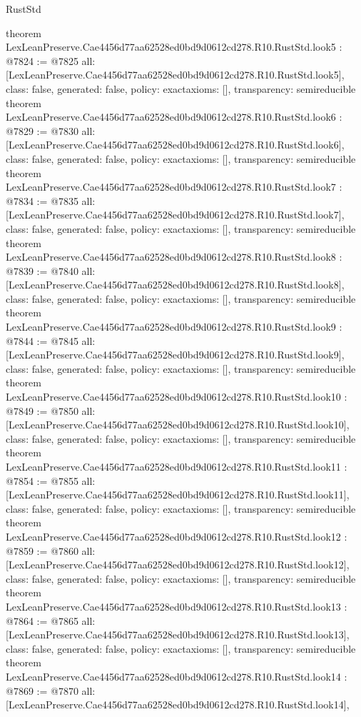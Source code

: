 \begin{lexlean}{RustStd}
\begin{coremodule}
{}
theorem LexLeanPreserve.Cae4456d77aa62528ed0bd9d0612cd278.R10.RustStd.look5 : @7824 := @7825 {
  all: [LexLeanPreserve.Cae4456d77aa62528ed0bd9d0612cd278.R10.RustStd.look5],
  class: false,
  generated: false,
  policy: exact{axioms: []},
  transparency: semireducible
}
theorem LexLeanPreserve.Cae4456d77aa62528ed0bd9d0612cd278.R10.RustStd.look6 : @7829 := @7830 {
  all: [LexLeanPreserve.Cae4456d77aa62528ed0bd9d0612cd278.R10.RustStd.look6],
  class: false,
  generated: false,
  policy: exact{axioms: []},
  transparency: semireducible
}
theorem LexLeanPreserve.Cae4456d77aa62528ed0bd9d0612cd278.R10.RustStd.look7 : @7834 := @7835 {
  all: [LexLeanPreserve.Cae4456d77aa62528ed0bd9d0612cd278.R10.RustStd.look7],
  class: false,
  generated: false,
  policy: exact{axioms: []},
  transparency: semireducible
}
theorem LexLeanPreserve.Cae4456d77aa62528ed0bd9d0612cd278.R10.RustStd.look8 : @7839 := @7840 {
  all: [LexLeanPreserve.Cae4456d77aa62528ed0bd9d0612cd278.R10.RustStd.look8],
  class: false,
  generated: false,
  policy: exact{axioms: []},
  transparency: semireducible
}
theorem LexLeanPreserve.Cae4456d77aa62528ed0bd9d0612cd278.R10.RustStd.look9 : @7844 := @7845 {
  all: [LexLeanPreserve.Cae4456d77aa62528ed0bd9d0612cd278.R10.RustStd.look9],
  class: false,
  generated: false,
  policy: exact{axioms: []},
  transparency: semireducible
}
theorem LexLeanPreserve.Cae4456d77aa62528ed0bd9d0612cd278.R10.RustStd.look10 : @7849 := @7850 {
  all: [LexLeanPreserve.Cae4456d77aa62528ed0bd9d0612cd278.R10.RustStd.look10],
  class: false,
  generated: false,
  policy: exact{axioms: []},
  transparency: semireducible
}
theorem LexLeanPreserve.Cae4456d77aa62528ed0bd9d0612cd278.R10.RustStd.look11 : @7854 := @7855 {
  all: [LexLeanPreserve.Cae4456d77aa62528ed0bd9d0612cd278.R10.RustStd.look11],
  class: false,
  generated: false,
  policy: exact{axioms: []},
  transparency: semireducible
}
theorem LexLeanPreserve.Cae4456d77aa62528ed0bd9d0612cd278.R10.RustStd.look12 : @7859 := @7860 {
  all: [LexLeanPreserve.Cae4456d77aa62528ed0bd9d0612cd278.R10.RustStd.look12],
  class: false,
  generated: false,
  policy: exact{axioms: []},
  transparency: semireducible
}
theorem LexLeanPreserve.Cae4456d77aa62528ed0bd9d0612cd278.R10.RustStd.look13 : @7864 := @7865 {
  all: [LexLeanPreserve.Cae4456d77aa62528ed0bd9d0612cd278.R10.RustStd.look13],
  class: false,
  generated: false,
  policy: exact{axioms: []},
  transparency: semireducible
}
theorem LexLeanPreserve.Cae4456d77aa62528ed0bd9d0612cd278.R10.RustStd.look14 : @7869 := @7870 {
  all: [LexLeanPreserve.Cae4456d77aa62528ed0bd9d0612cd278.R10.RustStd.look14],
}
\end{coremodule}
\end{lexlean}
